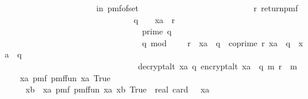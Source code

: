 \begin{isabellebody}
\ \ \ \ \ \ \ \ \ \ \ \ \ \ \ \ \ \ \ \ \ \ in\ pmf{\isacharunderscore}{\kern0pt}of{\isacharunderscore}{\kern0pt}set\ {\isasymZ}\ {\isasymbind}\isanewline
\ \ \ \ \ \ \ \ \ \ \ \ \ \ \ \ \ \ \ \ \ \ \ \ \ {\isacharparenleft}{\kern0pt}{\isasymlambda}r{\isachardot}{\kern0pt}\ return{\isacharunderscore}{\kern0pt}pmf\isanewline
\ \ \ \ \ \ \ \ \ \ \ \ \ \ \ \ \ \ \ \ \ \ \ \ \ \ \ \ \ \ \ {\isacharparenleft}{\kern0pt}{\isacharparenleft}{\kern0pt}q\ {\isasymin}\ {\isacharquery}{\kern0pt}{\isasymK}\ {\isacharminus}{\kern0pt}\ {\isacharbraceleft}{\kern0pt}xa{\isacharbraceright}{\kern0pt}\ {\isasymand}\ r\ {\isasymin}\ {\isasymZ}\ {\isasymor}\isanewline
\ \ \ \ \ \ \ \ \ \ \ \ \ \ \ \ \ \ \ \ \ \ \ \ \ \ \ \ \ \ \ \ \ prime\ q\ {\isasymand}\isanewline
\ \ \ \ \ \ \ \ \ \ \ \ \ \ \ \ \ \ \ \ \ \ \ \ \ \ \ \ \ \ \ \ \ q\ mod\ {}\ {\isacharequal}{\kern0pt}\ {}\ {\isasymand}\ r\ {\isacharless}{\kern0pt}\ xa\ {\isacharasterisk}{\kern0pt}\ q\ {\isasymand}\ coprime\ r\ {\isacharparenleft}{\kern0pt}xa\ {\isacharasterisk}{\kern0pt}\ q{\isacharparenright}{\kern0pt}\ {\isasymand}\ xa\ {\isasymnoteq}\ q{\isacharparenright}{\kern0pt}\ {\isasymor}\isanewline
\ \ \ \ \ \ \ \ \ \ \ \ \ \ \ \ \ \ \ \ \ \ \ \ \ \ \ \ \ \ \ \ decrypt{\isacharunderscore}{\kern0pt}alt\ xa\ q\ {\isacharparenleft}{\kern0pt}encrypt{\isacharunderscore}{\kern0pt}alt\ {\isacharparenleft}{\kern0pt}xa\ {\isacharasterisk}{\kern0pt}\ q{\isacharparenright}{\kern0pt}\ m\ r{\isacharparenright}{\kern0pt}\ {\isacharequal}{\kern0pt}\ m{\isacharparenright}{\kern0pt}{\isacharparenright}{\kern0pt}{\isacharparenright}{\kern0pt}{\isachardoublequoteclose}\isanewline
\isanewline
\ \ \isamarkupfalse%
\ {\isachardoublequoteopen}{\isasymAnd}xa{\isachardot}{\kern0pt}\ {\isacharparenleft}{\kern0pt}pmf\ {\isacharparenleft}{\kern0pt}{\isacharquery}{\kern0pt}pmf{\isacharunderscore}{\kern0pt}fun{\isacharprime}{\kern0pt}\ xa{\isacharparenright}{\kern0pt}\ True{\isacharparenright}{\kern0pt}\ {\isacharequal}{\kern0pt}\ \isanewline
\ \ \ \ \ {\isacharparenleft}{\kern0pt}{\isasymSum}xb{\isasymin}{\isacharparenleft}{\kern0pt}{\isacharquery}{\kern0pt}{\isasymK}\ {\isacharminus}{\kern0pt}\ {\isacharbraceleft}{\kern0pt}xa{\isacharbraceright}{\kern0pt}{\isacharparenright}{\kern0pt}{\isachardot}{\kern0pt}\ pmf\ {\isacharparenleft}{\kern0pt}{\isacharparenleft}{\kern0pt}{\isacharquery}{\kern0pt}pmf{\isacharunderscore}{\kern0pt}fun{\isacharprime}{\kern0pt}{\isacharprime}{\kern0pt}\ xa{\isacharparenright}{\kern0pt}\ xb{\isacharparenright}{\kern0pt}\ True{\isacharparenright}{\kern0pt}\ {\isacharslash}{\kern0pt}\ real\ {\isacharparenleft}{\kern0pt}card\ {\isacharparenleft}{\kern0pt}{\isacharquery}{\kern0pt}{\isasymK}\ {\isacharminus}{\kern0pt}\ {\isacharbraceleft}{\kern0pt}xa{\isacharbraceright}{\kern0pt}{\isacharparenright}{\kern0pt}{\isacharparenright}{\kern0pt}{\isachardoublequoteclose}\isanewline

\end{isabellebody}
